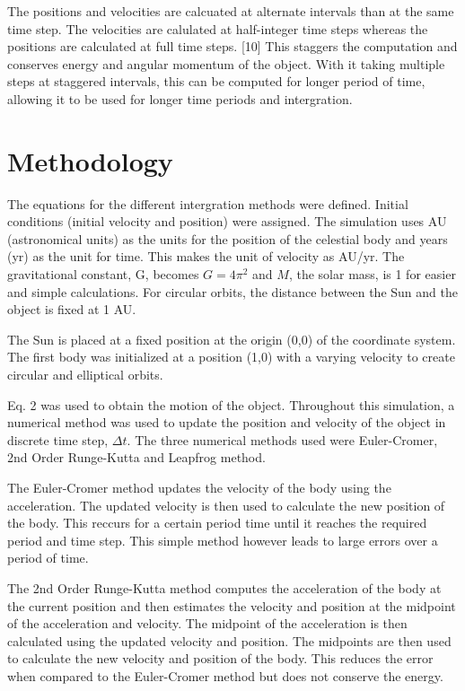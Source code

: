 \documentclass[11 pt, a4paper]{article}
\begin{document}
The positions and velocities are calcuated at alternate intervals than at the same time step. The velocities are calulated at half-integer time steps
whereas the positions are calculated at full time steps. [10] This staggers the computation and conserves energy and angular momentum of the object.
With it taking multiple steps at staggered intervals, this can be computed for longer period of time, allowing it to be used for longer time periods and intergration.

\section{Methodology}
The equations for the different intergration methods were defined. Initial conditions (initial velocity and position) were assigned.
The simulation uses AU (astronomical units) as the units for the position of the celestial body and years (yr) as the unit for time. This
makes the unit of velocity as AU/yr. The gravitational constant, G, becomes $G = 4 \pi^2$ and $M$, the solar mass, is 1 for easier and simple calculations. For circular orbits,
the distance between the Sun and the object is fixed at 1 AU.

The Sun is placed at a fixed position at the origin (0,0) of the coordinate system. The first body was initialized at a position (1,0) with a varying velocity to create circular and elliptical orbits.

Eq. 2 was used to obtain the motion of the object. Throughout this simulation, a numerical method was used to update the position and velocity of the object in discrete time step, $\Delta t$.
The three numerical methods used were Euler-Cromer, 2nd Order Runge-Kutta and Leapfrog method.

The Euler-Cromer method updates the velocity of the body using the acceleration. The updated velocity is then used to calculate the new position of the body. This reccurs for a certain period
time until it reaches the required period and time step. This simple method however leads to large errors over a period of time.

The 2nd Order Runge-Kutta method computes the acceleration of the body at the current position and then estimates the velocity and position at the midpoint of the acceleration and velocity.
The midpoint of the acceleration is then calculated using the updated velocity and position. The midpoints are then used to calculate the new velocity and position of the body. This reduces the error
when compared to the Euler-Cromer method but does not conserve the energy.
\end{document}
